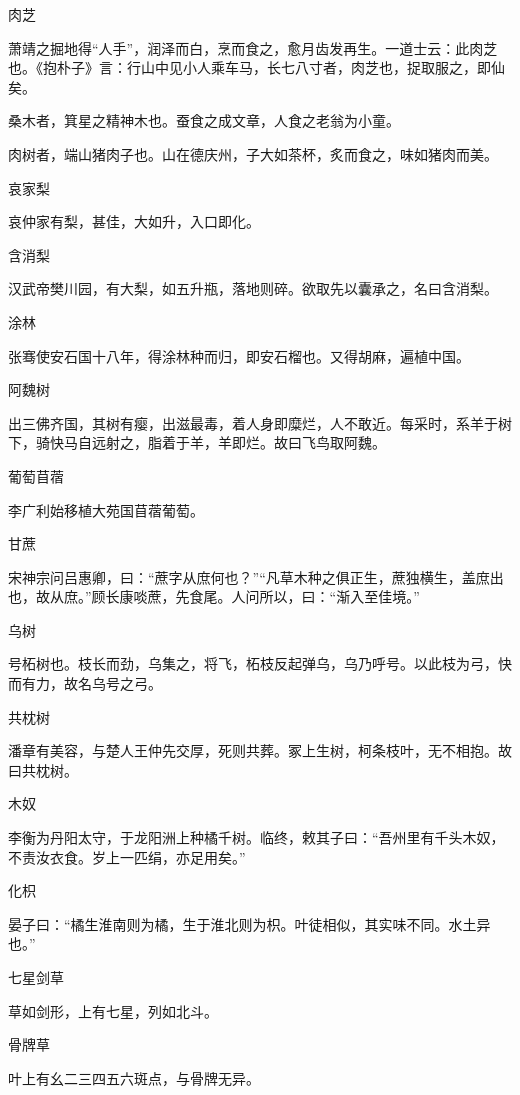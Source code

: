 \documentclass[a4paper,12pt,UTF8,twoside]{ctexbook}
\begin{document}
    肉芝
    
    萧靖之掘地得“人手”，润泽而白，烹而食之，愈月齿发再生。一道士云：此肉芝也。《抱朴子》言：行山中见小人乘车马，长七八寸者，肉芝也，捉取服之，即仙矣。
    
    桑木者，箕星之精神木也。蚕食之成文章，人食之老翁为小童。
    
    肉树者，端山猪肉子也。山在德庆州，子大如茶杯，炙而食之，味如猪肉而美。
    
    哀家梨
    
    哀仲家有梨，甚佳，大如升，入口即化。
    
    含消梨
    
    汉武帝樊川园，有大梨，如五升瓶，落地则碎。欲取先以囊承之，名曰含消梨。
    
    涂林
    
    张骞使安石国十八年，得涂林种而归，即安石榴也。又得胡麻，遍植中国。
    
    阿魏树
    
    出三佛齐国，其树有瘿，出滋最毒，着人身即糜烂，人不敢近。每采时，系羊于树下，骑快马自远射之，脂着于羊，羊即烂。故曰飞鸟取阿魏。
    
    葡萄苜蓿
    
    李广利始移植大苑国苜蓿葡萄。
    
    甘蔗
    
    宋神宗问吕惠卿，曰：“蔗字从庶何也？”“凡草木种之俱正生，蔗独横生，盖庶出也，故从庶。”顾长康啖蔗，先食尾。人问所以，曰：“渐入至佳境。”
    
    乌树
    
    号柘树也。枝长而劲，乌集之，将飞，柘枝反起弹乌，乌乃呼号。以此枝为弓，快而有力，故名乌号之弓。
    
    共枕树
    
    潘章有美容，与楚人王仲先交厚，死则共葬。冢上生树，柯条枝叶，无不相抱。故曰共枕树。
    
    木奴
    
    李衡为丹阳太守，于龙阳洲上种橘千树。临终，敕其子曰：“吾州里有千头木奴，不责汝衣食。岁上一匹绢，亦足用矣。”
    
    化枳
    
    晏子曰：“橘生淮南则为橘，生于淮北则为枳。叶徒相似，其实味不同。水土异也。”
    
    七星剑草
    
    草如剑形，上有七星，列如北斗。
    
    骨牌草
    
    叶上有幺二三四五六斑点，与骨牌无异。
    
\end{document}
